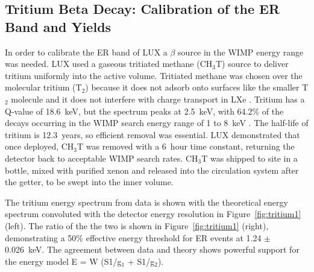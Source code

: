 \subsection{Tritium Beta Decay: Calibration of the ER Band and Yields}
In order to calibrate the \ac{ER} band of \ac{LUX} a $\beta$ source in the \ac{WIMP} energy range was needed. \ac{LUX} used a gaseous tritiated methane (CH$_{3}$T) source to deliver tritium uniformly into the active volume. Tritiated methane was chosen over the molecular tritium (T$_{2}$) because it does not adsorb onto surfaces like the smaller T$_{2}$ molecule and it does not interfere with charge transport in \ac{LXe} \cite{LUXTritium}. Tritium has a Q-value of 18.6~keV, but the spectrum peaks at 2.5~keV, with 64.2\% of the decays occurring in the \ac{WIMP} search energy range of 1 to 8~keV \cite{LUXTritium}. The half-life of tritium is 12.3~years, so efficient removal was essential. \ac{LUX} demonstrated that once deployed, CH$_{3}$T was removed with a 6~hour time constant, returning the detector back to acceptable \ac{WIMP} search rates. CH$_{3}$T was shipped to site in a bottle, mixed with purified xenon and released into the circulation system after the getter, to be swept into the inner volume. 

The tritium energy spectrum from data is shown with the theoretical energy spectrum convoluted with the detector energy resolution in Figure~\ref{fig:tritium1} (left). The ratio of the the two is shown in Figure~\ref{fig:tritium1} (right), demonstrating a 50\% effective energy threshold for \ac{ER} events at 1.24 $\pm$ 0.026~keV. The agreement between data and theory shows powerful support for the energy model E = W (S1/g$_{1}$ + S1/g$_{2}$). 

